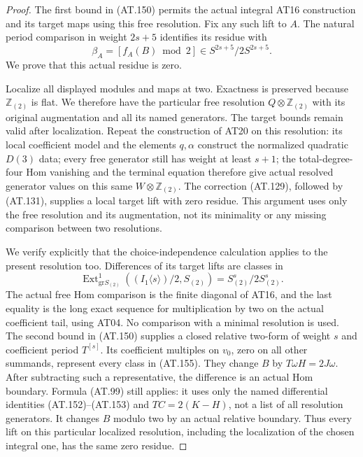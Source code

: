 \begin{proof}
The first bound in (AT.150) permits the actual integral
AT16 construction and its target maps using this free
resolution. Fix any such lift to $A$.
The natural period comparison in weight $2s+5$ identifies
its residue with
\[
          \beta_A=[f_A(B)\bmod2]\in S^{2s+5}/2S^{2s+5}.
 \tag{AT.154}
\]
We prove that this actual residue is zero.

Localize all displayed modules and maps at two.
Exactness is preserved because $\mathbb Z_{(2)}$ is flat.
We therefore have the particular free resolution
$Q\otimes\mathbb Z_{(2)}$ with its original augmentation
and all its named generators.
The target bounds remain valid after localization.
Repeat the construction of AT20 on this resolution:
its local coefficient model and the elements $q,\alpha$
construct the normalized quadratic $D(3)$ data;
every free generator still has weight at least $s+1$;
the total-degree-four Hom vanishing and the terminal
equation therefore give actual resolved generator values
on this same $W\otimes\mathbb Z_{(2)}$.
The correction (AT.129), followed by (AT.131), supplies
a local target lift with zero residue.
This argument uses only the free resolution and its
augmentation, not its minimality or any missing
comparison between two resolutions.

We verify explicitly that the choice-independence
calculation applies to the present resolution too.
Differences of its target lifts are classes in
\[
 \operatorname{Ext}^1_{\mathrm{gr}S_{(2)}}
       ((I_1\langle s\rangle)/2,S_{(2)})
                   =S_{(2)}^s/2S_{(2)}^s.
 \tag{AT.155}
\]
The actual free Hom comparison is the finite diagonal
of AT16, and the last equality is the long exact
sequence for multiplication by two on the actual
coefficient tail, using AT04.
No comparison with a minimal resolution is used.
The second bound in (AT.150) supplies a closed relative
two-form of weight $s$ and coefficient period $T^{[s]}$.
Its coefficient multiples on $v_0$, zero on all other
summands, represent every class in (AT.155).
They change $B$ by $T\omega H=2J\omega$.
After subtracting such a representative, the difference
is an actual Hom boundary. Formula (AT.99) still applies:
it uses only the named differential identities
(AT.152)--(AT.153) and $TC=2(K-H)$, not a list of all
resolution generators. It changes $B$ modulo two by
an actual relative boundary.
Thus every lift on this particular localized resolution,
including the localization of the chosen integral one,
has the same zero residue.


\end{proof}
